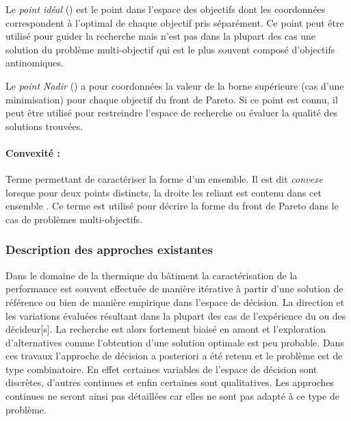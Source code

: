 Le \emph{point idéal} () est le point dans l’espace des objectifs dont
les coordonnées correspondent à l’optimal de chaque objectif pris séparément. Ce point
peut être utilisé pour guider la recherche mais n’est pas dans la plupart des cas
une solution du problème multi-objectif qui est le plus souvent composé d’objectifs
antinomiques.

Le \emph{point Nadir} () a pour coordonnées la
valeur de la borne supérieure (cas d’une minimisation) pour chaque objectif du front
de Pareto. Si ce point est connu, il peut être utilisé pour restreindre l’espace
de recherche ou évaluer la qualité des solutions trouvées.

\paragraph{Convexité :} %
\label{par:convexite}
Terme permettant de caractériser la forme d’un ensemble.
Il est dit \emph{convexe} lorsque pour deux points distincts, la droite les reliant
est contenu dans cet ensemble \parencite{Collette2002}. Ce terme est utilisé pour décrire
la forme du front de Pareto dans le cas de problèmes multi-objectifs.

\subsubsection{Description des approches existantes} %
\label{ssub:description_des_approches_existantes}
Dans le domaine de la thermique du bâtiment la caractérisation
de la performance est souvent effectuée de manière itérative à partir d’une solution
de référence ou bien de manière empirique dans l’espace de décision. La direction et
les variations évaluées résultant dans la plupart des cas de l’expérience du ou des
décideur[s]. La recherche est alors fortement biaisé en amont et l’exploration
d’alternatives comme l’obtention d’une solution optimale est peu probable.
Dans ces travaux l’approche de décision a posteriori a été retenu et le problème
est de type combinatoire. En effet certaines variables de l’espace de décision
sont discrètes, d’autres continues et enfin certaines sont qualitatives. Les approches
continues ne seront ainsi pas détaillées car elles ne sont pas adapté à ce type de
problème.

